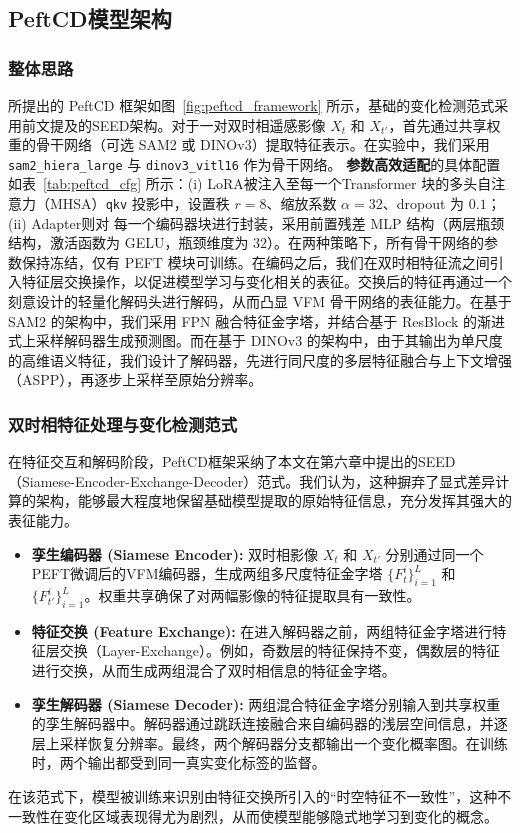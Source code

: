 \subsection{PeftCD模型架构}

\subsubsection{整体思路}

所提出的 PeftCD 框架如图~\ref{fig:peftcd_framework} 所示，基础的变化检测范式采用前文提及的SEED架构。对于一对双时相遥感影像 $X_t$ 和 $X_{t'}$，首先通过共享权重的骨干网络（可选 SAM2 或 DINOv3）提取特征表示。在实验中，我们采用 \texttt{sam2\_hiera\_large} 与 \texttt{dinov3\_vitl16} 作为骨干网络。  
\textbf{参数高效适配}的具体配置如表~\ref{tab:peftcd_cfg} 所示：(i) LoRA被注入至每一个Transformer 块的多头自注意力（MHSA）\texttt{qkv} 投影中，设置秩 $r{=}8$、缩放系数 $\alpha{=}32$、dropout 为 $0.1$；(ii) Adapter则对 每一个编码器块进行封装，采用前置残差 MLP 结构（两层瓶颈结构，激活函数为 GELU，瓶颈维度为 $32$）。在两种策略下，所有骨干网络的参数保持冻结，仅有 PEFT 模块可训练。在编码之后，我们在双时相特征流之间引入特征层交换操作，以促进模型学习与变化相关的表征。交换后的特征再通过一个刻意设计的轻量化解码头进行解码，从而凸显 VFM 骨干网络的表征能力。在基于 SAM2 的架构中，我们采用 FPN 融合特征金字塔，并结合基于 ResBlock 的渐进式上采样解码器生成预测图。而在基于 DINOv3 的架构中，由于其输出为单尺度的高维语义特征，我们设计了解码器，先进行同尺度的多层特征融合与上下文增强（ASPP），再逐步上采样至原始分辨率。

\subsubsection{双时相特征处理与变化检测范式}
在特征交互和解码阶段，PeftCD框架采纳了本文在第六章中提出的SEED（Siamese-Encoder-Exchange-Decoder）范式。我们认为，这种摒弃了显式差异计算的架构，能够最大程度地保留基础模型提取的原始特征信息，充分发挥其强大的表征能力。
\begin{itemize}
    \item \textbf{孪生编码器 (Siamese Encoder):} 双时相影像 $X_t$ 和 $X_{t'}$ 分别通过同一个PEFT微调后的VFM编码器，生成两组多尺度特征金字塔 $\{F_t^i\}_{i=1}^L$ 和 $\{F_{t'}^i\}_{i=1}^L$。权重共享确保了对两幅影像的特征提取具有一致性。
    \item \textbf{特征交换 (Feature Exchange):} 在进入解码器之前，两组特征金字塔进行特征层交换（Layer-Exchange）。例如，奇数层的特征保持不变，偶数层的特征进行交换，从而生成两组混合了双时相信息的特征金字塔。
    \item \textbf{孪生解码器 (Siamese Decoder):} 两组混合特征金字塔分别输入到共享权重的孪生解码器中。解码器通过跳跃连接融合来自编码器的浅层空间信息，并逐层上采样恢复分辨率。最终，两个解码器分支都输出一个变化概率图。在训练时，两个输出都受到同一真实变化标签的监督。
\end{itemize}
在该范式下，模型被训练来识别由特征交换所引入的“时空特征不一致性”，这种不一致性在变化区域表现得尤为剧烈，从而使模型能够隐式地学习到变化的概念。

